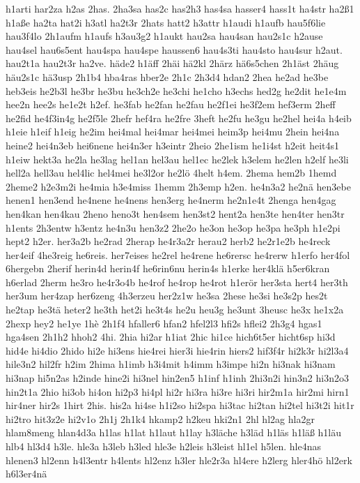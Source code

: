 {h1arti
har2za
h2as
2has.
2ha3sa
has2c
has2h3
has4sa
hasser4
hass1t
ha4str
ha2ß1
h1aße
ha2ta
hat2i
h3atl
ha2t3r
2hats
hatt2
h3attr
h1audi
h1aufb
hau5f6lie
hau3f4lo
2h1aufm
h1aufs
h3au3g2
h1aukt
hau2sa
hau4san
hau2s1c
h2ause
hau4sel
hau6s5ent
hau4spa
hau4spe
haussen6
hau4s3ti
hau4sto
hau4sur
h2aut.
hau2t1a
hau2t3r
ha2ve.
häde2
h1äff
2häi
hä2kl
2härz
hä6s5chen
2h1äst
2häug
häu2s1c
hä3usp
2h1b4
hba4ras
hber2e
2h1c
2h3d4
hdan2
2hea
he2ad
he3be
heb3eis
he2b3l
he3br
he3bu
he3ch2e
he3chi
he1cho
h3echs
hed2g
he2dit
he1e4m
hee2n
hee2s
he1e2t
h2ef.
he3fab
he2fan
he2fau
he2f1ei
he3f2em
hef3erm
2heff
he2fid
he4f3in4g
he2f5le
2hefr
hef4ra
he2fre
3heft
he2fu
he3gu
he2hel
hei4a
h4eib
h1eie
h1eif
h1eig
he2im
hei4mal
hei4mar
hei4mei
heim3p
hei4mu
2hein
hei4na
heine2
hei4n3eb
hei6nene
hei4n3er
h3eintr
2heio
2he1ism
he1i4st
h2eit
heit4s1
h1eiw
hekt3a
he2la
he3lag
hel1an
hel3au
hel1ec
he2lek
h3elem
he2len
h2elf
he3li
hell2a
hell3au
hel4lic
hel4mei
he3l2or
he2lö
4helt
h4em.
2hema
hem2b
1hemd
2heme2
h2e3m2i
he4mia
h3e4miss
1hemm
2h3emp
h2en.
he4n3a2
he2nä
hen3ebe
henen1
hen3end
he4nene
he4nens
hen3erg
he4nerm
he2n1e4t
2henga
hen4gag
hen4kan
hen4kau
2heno
heno3t
hen4sem
hen3st2
hent2a
hen3te
hen4ter
hen3tr
h1ents
2h3entw
h3entz
he4n3u
hen3z2
2he2o
he3on
he3op
he3pa
he3ph
h1e2pi
hept2
h2er.
her3a2b
he2rad
2herap
he4r3a2r
herau2
herb2
he2r1e2b
he4reck
her4eif
4he3reig
he6reis.
her7eises
he2rel
he4rene
he6rersc
he4rerw
h1erfo
her4fol
6hergebn
2herif
herin4d
herin4f
he6rin6nu
herin4s
h1erke
her4klä
h5er6kran
h6erlad
2herm
he3ro
he4r3o4b
he4rof
he4rop
he4rot
h1erör
her3sta
hert4
her3th
her3um
her4zap
her6zeng
4h3erzeu
her2z1w
he3sa
2hese
he3si
he3s2p
hes2t
he2tap
he3tä
heter2
he3th
het2i
he3t4s
he2u
heu3g
he3unt
3heusc
he3x
he1x2a
2hexp
hey2
he1ye
1hè
2h1f4
hfaller6
hfan2
hfel2l3
hfi2s
hflei2
2h3g4
hgas1
hga4sen
2h1h2
hhoh2
4hi.
2hia
hi2ar
h1iat
2hic
hi1ce
hich6t5er
hicht6sp
hi3d
hid4e
hi4dio
2hido
hi2e
hi3ens
hie4rei
hier3i
hie4rin
hiers2
hif3f4r
hi2k3r
hi2l3a4
hile3n2
hil2fr
h2im
2hima
h1imb
h3i4mit
h4imm
h3impe
hi2n
hi3nak
hi3nam
hi3nap
hi5n2as
h2inde
hine2i
hi3nel
hin2en5
h1inf
h1inh
2hi3n2i
hin3n2
hi3n2o3
hin2t1a
2hio
hi3ob
hi4on
hi2p3
hi4pl
hi2r
hi3ra
hi3re
hi3ri
hir2m1a
hir2mi
hirn1
hir4ner
hir2s
1hirt
2his.
his2a
hi4se
h1i2so
hi2spa
hi3tac
hi2tan
hi2tel
hi3t2i
hit1r
hi2tro
hit3z2e
hi2v1o
2h1j
2h1k4
hkamp2
h2keu
hki2n1
2hl
hl2ag
hla2gr
hlam8meng
hlan4d3a
h1las
h1lat
h1laut
h1lay
h3läche
h3läd
h1läs
h1läß
h1läu
hlb4
hl3d4
h3le.
hle3a
h3leb
h3led
hle3e
h2leis
h3leist
hl1el
h5len.
hle4nas
hlenen3
hl2enn
h4l3entr
h4lents
hl2enz
h3ler
hle2r3a
hl4ere
h2lerg
hler4hö
hl2erk
h6l3er4nä
}
